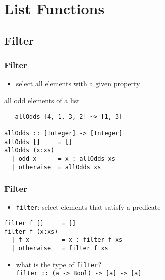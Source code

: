 \documentclass[dvipsnames]{beamer}
\theoremstyle{plain}
\begin{document}
\section{List Functions}

\subsection{Filter}

\begin{frame}[fragile]
  \frametitle{Filter}

  \begin{itemize}
    \item select all elements with a given property
  \end{itemize}

  \begin{exampleblock}{all odd elements of a list}
    \begin{lstlisting}
-- allOdds [4, 1, 3, 2] ~> [1, 3]

allOdds :: [Integer] -> [Integer]
allOdds []     = []
allOdds (x:xs)
  | odd x      = x : allOdds xs
  | otherwise  = allOdds xs
    \end{lstlisting}
  \end{exampleblock}
\end{frame}

\begin{frame}[fragile]
  \frametitle{Filter}

  \begin{itemize}
    \item \lstinline|filter|: select elements that satisfy a predicate
  \end{itemize}

  \begin{exampleblock}{}
    \begin{lstlisting}[deletekeywords={filter}]
filter f []     = []
filter f (x:xs)
  | f x         = x : filter f xs
  | otherwise   = filter f xs
    \end{lstlisting}
  \end{exampleblock}

  \pause
  \begin{itemize}
    \item what is the type of \lstinline|filter|?\\
      \lstinline|filter :: (a -> Bool) -> [a] -> [a]|
  \end{itemize}
\end{frame}
\end{document}
